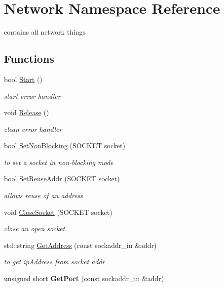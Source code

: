 \hypertarget{namespace_network}{}\section{Network Namespace Reference}
\label{namespace_network}


contains all network things  


\subsection*{Functions}
\begin{DoxyCompactItemize}
\item 
bool \hyperlink{namespace_network_af8698db2b5ae3d0da4544304cffc3abb}{Start} ()
\begin{DoxyCompactList}\small\item\em start error handler \end{DoxyCompactList}\item 
\mbox{\label{namespace_network_a676c065de2077bbb8e64ef84dfde1640}} 
void \hyperlink{namespace_network_a676c065de2077bbb8e64ef84dfde1640}{Release} ()
\begin{DoxyCompactList}\small\item\em clean error handler \end{DoxyCompactList}\item 
bool \hyperlink{namespace_network_a907c6a68c883d4e7b8d12df59b107a4e}{Set\+Non\+Blocking} (S\+O\+C\+K\+ET socket)
\begin{DoxyCompactList}\small\item\em to set a socket in non-\/blocking mode \end{DoxyCompactList}\item 
bool \hyperlink{namespace_network_af60ca5be87dc2bb828053b77586c5db1}{Set\+Reuse\+Addr} (S\+O\+C\+K\+ET socket)
\begin{DoxyCompactList}\small\item\em allows reuse of an address \end{DoxyCompactList}\item 
void \hyperlink{namespace_network_a709c320df831b3a900af6ae1c8849b00}{Close\+Socket} (S\+O\+C\+K\+ET socket)
\begin{DoxyCompactList}\small\item\em close an open socket \end{DoxyCompactList}\item 
std\+::string \hyperlink{namespace_network_a0b77e5f397e6738b7e68d51cf0d3e46a}{Get\+Address} (const sockaddr\+\_\+in \&addr)
\begin{DoxyCompactList}\small\item\em to get ip\+Address from socket addr \end{DoxyCompactList}\item 
\mbox{\label{namespace_network_ac815d49aae02b422d1aae507f9475a72}} 
unsigned short {\bfseries Get\+Port} (const sockaddr\+\_\+in \&addr)
\end{DoxyCompactItemize}


